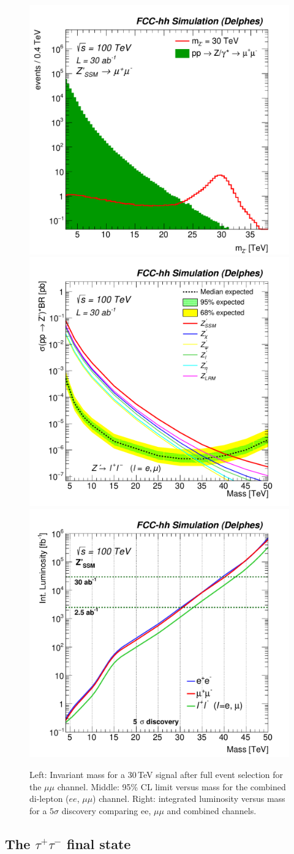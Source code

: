 \documentclass[a4paper,11pt]{article}
\newcommand*{\tautau}{\ensuremath{\tau^{+}\tau^{-}}}
\begin{document}
\begin{figure}[!htb]
  \centering
  \includegraphics[width=0.32\columnwidth]{Fig/mzp_sel0_nostack_log_mm-eps-converted-to.pdf}
  \includegraphics[width=0.32\columnwidth]{Fig/lim_Zprime_ll_fcc_v02_allxs-eps-converted-to.pdf}
  \includegraphics[width=0.32\columnwidth]{Fig/DiscoveryPotential_ll_comb_rootStyle-eps-converted-to.pdf}
  \caption{Left: Invariant mass for a 30\,TeV signal after full event selection for the $\mu\mu$ channel. Middle: 95\% CL limit versus mass for the combined di-lepton ($ee$, $\mu\mu$) channel. Right: integrated luminosity versus mass for a $5\sigma$ discovery comparing ee, $\mu\mu$ and combined channels.}
  \label{figure:leptonicresonances:ll}
\end{figure}



\subsection{The \texorpdfstring{\tautau}{tautau} final state}
\label{sec:leptautau}
\end{document}
